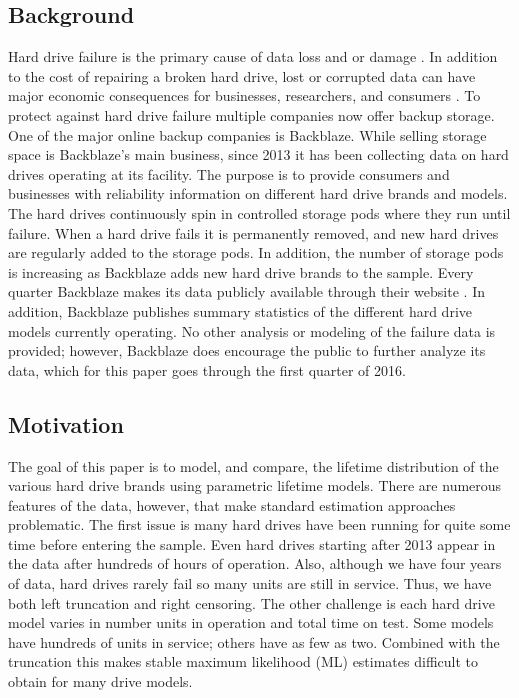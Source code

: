 \documentclass[12pt]{article}
\begin{document}
\subsection{Background}
Hard drive failure is the primary cause of data loss and or damage \cite{harris}.  In addition to the cost of repairing a broken hard drive, lost or corrupted data can have major economic consequences for businesses, researchers, and consumers \cite{smith}.  To protect against hard drive failure multiple companies now offer backup storage.  One of the major online backup companies is Backblaze.  While selling storage space is Backblaze's main business, since 2013 it has been collecting data on hard drives operating at its facility.  The purpose is to provide consumers and businesses with reliability information on different hard drive brands and models.  The hard drives continuously spin in controlled storage pods where they run until failure.  When a hard drive fails it is permanently removed, and new hard drives are regularly added to the storage pods.  In addition, the number of storage pods is increasing as Backblaze adds new hard drive brands to the sample.  Every quarter Backblaze makes its data publicly available through their website \cite{backblaze}.  In addition, Backblaze publishes summary statistics of the different hard drive models currently operating.  No other analysis or modeling of the failure data is provided; however, Backblaze does encourage the public to further analyze its data, which for this paper goes through the first quarter of 2016.
 
 
\subsection{Motivation}
The goal of this paper is to model, and compare, the lifetime distribution of the various hard drive brands using parametric lifetime models.  There are numerous features of the data, however, that make standard estimation approaches problematic.  The first issue is many hard drives have been running for quite some time before entering the sample.  Even hard drives starting after 2013 appear in the data after hundreds of hours of operation.  Also, although we have four years of data, hard drives rarely fail so many units are still in service.  Thus, we have both left truncation and right censoring.  The other challenge is each hard drive model varies in number units in operation and total time on test.  Some models have hundreds of units in service; others have as few as two.  Combined with the truncation this makes stable maximum likelihood (ML) estimates difficult to obtain for many drive models. \\
\end{document}
